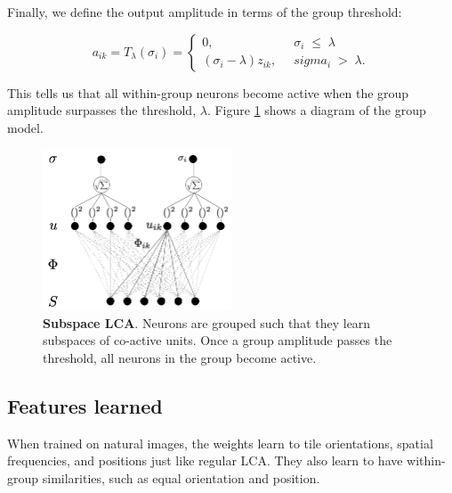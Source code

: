Finally, we define the output amplitude in terms of the group threshold:

\begin{equation}\label{eq:ch3_subspace_threshold_func}
    a_{ik} = T_{\lambda}(\sigma_{i}) = \left\{
    \begin{aligned}
        0,\;\; & \sigma_{i}\; \leq\; \lambda \\
        (\sigma_{i}-\lambda)z_{ik},\;\; &sigma_{i}\; >\; \lambda.
    \end{aligned}
    \right.
\end{equation}

This tells us that all within-group neurons become active when the group amplitude surpasses the threshold, $\lambda$. Figure \ref{fig:ch3_subspace_lca_graph} shows a diagram of the group model.

\begin{figure}[h]
    \centering
    \includegraphics[width=0.5\textwidth]{figures/subspace_lca_graph.png}
    \caption{\textbf{Subspace LCA}. Neurons are grouped such that they learn subspaces of co-active units. Once a group amplitude passes the threshold, all neurons in the group become active.}
    \label{fig:ch3_subspace_lca_graph}
\end{figure}

\subsection{Features learned}
When trained on natural images, the weights learn to tile orientations, spatial frequencies, and positions just like regular LCA. They also learn to have within-group similarities, such as equal orientation and position.

